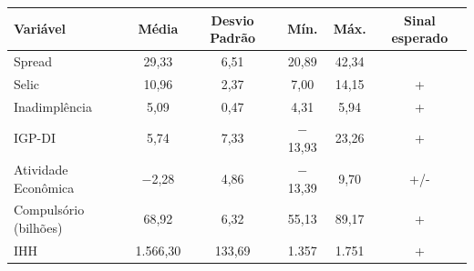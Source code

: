\documentclass[a4paper, article, 12pt, openany, oneside, english, brazil]{abntex2}
\begin{document}
    \begin{table}[t]
        {
            \begin{tabular}
                {@{\extracolsep{5pt}}lccccc}
                \midrule
                \midrule
                Variável & \multicolumn{1}{c}{Média} & \multicolumn{1}{c}{Desvio Padrão} & \multicolumn{1}{c}{Mín.} & \multicolumn{1}{c}{Máx.} & \multicolumn{1}{c}{Sinal esperado} \\
                \midrule
                Spread & 29,33 & 6,51 & 20,89 & 42,34 &  \\
                Selic & 10,96 & 2,37 & 7,00 & 14,15 & + \\
                Inadimplência & 5,09 & 0,47 & 4,31 & 5,94 & + \\
                IGP-DI & 5,74 & 7,33 & $-$13,93 & 23,26 & + \\
                Atividade Econômica & $-$2,28 & 4,86 & $-$13,39 & 9,70 & +/- \\
                Compulsório (bilhões) & 68,92 & 6,32 & 55,13 & 89,17 & + \\
                IHH & 1.566,30 & 133,69 & 1.357 & 1.751 & + \\
                \midrule
            \end{tabular}
        }
        {}
    \end{table}



\end{document}
